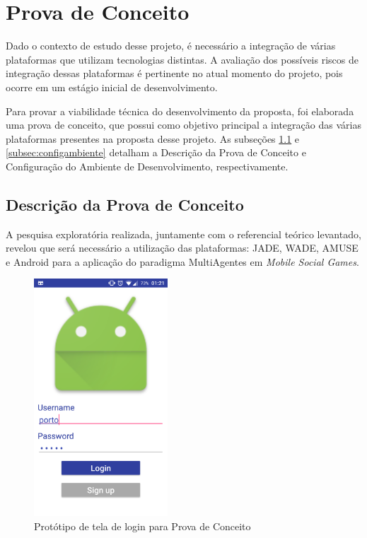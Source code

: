 \section{Prova de Conceito}
\label{sec:provaconceito}

Dado o contexto de estudo desse projeto, é necessário a integração de várias
plataformas que utilizam tecnologias distintas. A avaliação dos possíveis
riscos de integração dessas plataformas é pertinente no atual momento do
projeto, pois ocorre em um estágio inicial de desenvolvimento.

Para provar a viabilidade técnica do desenvolvimento da proposta, foi elaborada
uma prova de conceito, que possui como objetivo principal a integração das
várias plataformas presentes na proposta desse projeto. As subseções
\ref{subsec:descconceito} e \ref{subsec:configambiente} detalham a Descrição da
Prova de Conceito e Configuração do Ambiente de Desenvolvimento,
respectivamente.

  \subsection{Descrição da Prova de Conceito}
  \label{subsec:descconceito}
  A pesquisa exploratória realizada, juntamente com o referencial teórico
  levantado, revelou que será necessário a utilização das plataformas: JADE,
  WADE, AMUSE e Android para a aplicação do paradigma MultiAgentes em
  \textit{Mobile Social Games}.

  \begin{figure}[h]
    \centering
    \includegraphics[width=5cm]{figuras/login_screen}
    \caption{Protótipo de tela de login para Prova de Conceito}
    \label{figura:login_screen}
  \end{figure}

